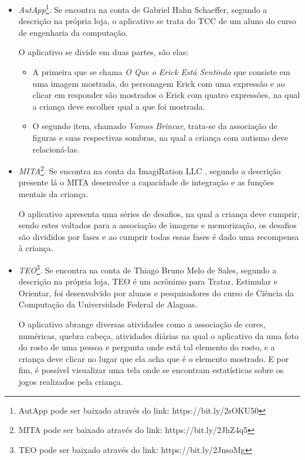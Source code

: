 
\begin{itemize}
	\item \textit{AutApp}\footnote{AutApp pode ser baixado através do link: https://bit.ly/2sOKU50}. Se encontra na conta de Gabriel Hahn Schaeffer, segundo a descrição na própria loja, o aplicativo se trata do TCC de um aluno do curso de engenharia da computação.
	
	O aplicativo se divide em duas partes, são elas: 	
	\begin{itemize}
		\item A primeira que se chama \textit{O Que o Erick Está Sentindo} que consiste em uma imagem mostrada, do personagem Erick com uma expressão e ao clicar em responder são mostrados o Erick com quatro expressões, na qual a criança deve escolher qual a que foi mostrada.
		
		\item O segundo item, chamado  \textit{Vamos Brincar}, trata-se da associação de figuras e suas respectivas sombras, na qual a criança com autismo deve relacioná-las.
	\end{itemize}
	\item \textit{MITA}\footnote{MITA pode ser baixado através do link: https://bit.ly/2JhZ4q5}. Se encontra na conta da ImagiRation LLC , segundo a descrição presente lá o MITA desenvolve a capacidade de integração e as funções mentais da criança.
	
	O aplicativo apresenta uma séries de desafios, na qual a criança deve cumprir, sendo estes voltados para a associação de imagens e memorização, os desafios são divididos por fases e ao cumprir todas essas fases é dado uma recompensa à criança.
	
	\item \textit{TEO}\footnote{TEO pode ser baixado através do link: https://bit.ly/2JnsoMg}.  Se encontra na conta de Thiago Bruno Melo de Sales, segundo a descrição na própria loja, TEO é um acrônimo para Tratar, Estimular e Orientar, foi desenvolvido por alunos e pesquisadores do curso de Ciência da Computação da Universidade Federal de Alagoas.
	
	O aplicativo abrange diversas atividades como a associação de cores, numéricas, quebra cabeça, atividades diárias na qual o aplicativo da uma foto do rosto de uma pessoa e pergunta onde está tal elemento do rosto, e a criança deve clicar no lugar que ela acha que é o elemento mostrado. E por fim, é possível visualizar uma tela onde se encontram estatísticas sobre os jogos realizados pela criança.
	

\end{itemize}
